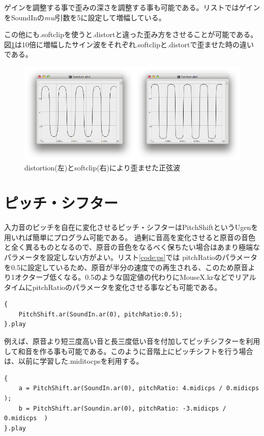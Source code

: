 \documentclass{jsarticle}
\begin{document}
ゲインを調整する事で歪みの深さを調整する事も可能である。リストではゲインをSoundInの{\it mul}引数を5に設定して増幅している。

この他にも.softclipを使うと.distortと違った歪み方をさせることが可能である。図\ref{fig:comparison}は10倍に増幅したサイン波をそれぞれ.softclipと.distortで歪ませた時の違いである。

\begin{figure}[ftbp]
	\begin{center}
		\includegraphics[scale=0.6]{comparison.pdf}
	\end{center}
	\caption{distortion(左)とsoftclip(右)により歪ませた正弦波}
	\label{fig:comparison}
\end{figure}

\section{ピッチ・シフター}
入力音のピッチを自在に変化させるピッチ・シフターはPitchShiftというUgenを用いれば簡単にプログラム可能である。
過剰に音高を変化させると原音の音色と全く異るものとなるので、原音の音色をなるべく保ちたい場合はあまり極端なパラメータを設定しない方がよい。リスト\ref{code:ps}では pitchRatioのパラメータを0.5に設定しているため、原音が半分の速度での再生される、このため原音より1オクターブ低くなる。0.5のような固定値の代わりにMouseX.krなどでリアルタイムにpitchRatioのパラメータを変化させる事なども可能である。

\begin{lstlisting}[caption=ピッチシフター, label=code:ps]
{
	PitchShift.ar(SoundIn.ar(0), pitchRatio:0.5);
}.play
\end{lstlisting}

例えば、原音より短三度高い音と長三度低い音を付加してピッチシフターを利用して和音を作る事も可能である。このように音階上にピッチシフトを行う場合は、以前に学習した.miditocpsを利用する。

\begin{lstlisting}[caption=ピッチシフターによる和音, label=code:ps_chord]
{
	a = PitchShift.ar(SoundIn.ar(0), pitchRatio: 4.midicps / 0.midicps );
	b = PitchShift.ar(Soundin.ar(0), pitchRatio: -3.midicps / 0.midicps  )
}.play
\end{lstlisting}
\end{document}
